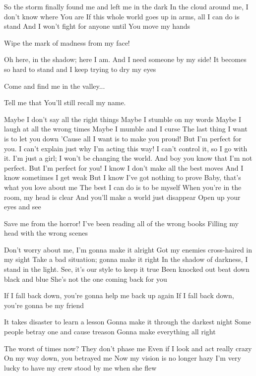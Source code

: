 So the storm finally found me and left me in the dark
In the cloud around me, I don’t know where You are
If this whole world goes up in arms, all I can do is stand
And I won’t fight for anyone until You move my hands

Wipe the mark of madness from my face!

Oh here, in the shadow; here I am.
And I need someone by my side!
It becomes so hard to stand and I keep trying to dry my eyes

Come and find me in the valley...

Tell me that You'll still recall my name.


Maybe I don't say all the right things
Maybe I stumble on my words
Maybe I laugh at all the wrong times
Maybe I mumble and I curse
The last thing I want is to let you down
'Cause all I want is to make you proud!
But I'm perfect for you.
I can't explain just why I'm acting this way!
I can't control it, so I go with it.
I'm just a girl; I won't be changing the world.
And boy you know that I'm not perfect.
But I'm perfect for you!
I know I don't make all the best moves
And I know sometimes I get weak
But I know I've got nothing to prove
Baby, that's what you love about me
The best I can do is to be myself
When you're in the room, my head is clear
And you'll make a world just disappear
Open up your eyes and see


Save me from the horror!
I've been reading all of the wrong books
Filling my head with the wrong scenes

Don't worry about me, I'm gonna make it alright
Got my enemies cross-haired in my sight
Take a bad situation; gonna make it right
In the shadow of darkness, I stand in the light.
See, it's our style to keep it true
Been knocked out beat down black and blue
She's not the one coming back for you

If I fall back down, you're gonna help me back up again
If I fall back down, you're gonna be my friend

It takes disaster to learn a lesson
Gonna make it through the darkest night
Some people betray one and cause treason
Gonna make everything all right

The worst of times now? They don't phase me
Even if I look and act really crazy
On my way down, you betrayed me
Now my vision is no longer hazy
I'm very lucky to have my crew stood by me when she flew

